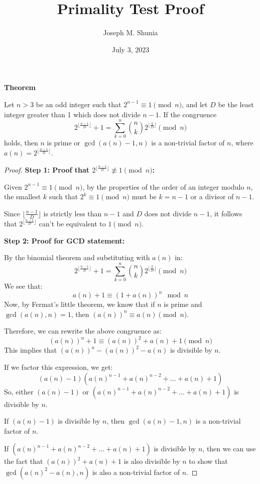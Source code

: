 \documentclass{article}
\title{Primality Test Proof}
\author{Joseph M. Shunia}
\date{July 3, 2023}
\begin{document}
\maketitle

\textbf{Theorem}
\begin{theorem}
Let $n > 3$ be an odd integer such that $2^{n-1} \equiv 1 \pmod{n}$, and let $D$ be the least integer greater than 1 which does not divide $n-1$. If the congruence
\[
2^{\lfloor\frac{n-1}{D}\rfloor} + 1 = \sum_{k=0}^{n}\binom{n}{k}2^{\lfloor\frac{k}{D}\rfloor} \pmod{n}
\]
holds, then $n$ is prime or $\gcd(a(n) - 1, n)$ is a non-trivial factor of $n$, where $a(n) = 2^{\lfloor\frac{n-1}{D}\rfloor}$.
\end{theorem}

\begin{proof}
\textbf{Step 1: Proof that $2^{\lfloor\frac{n-1}{D}\rfloor} \not\equiv 1 \pmod{n}$:}

Given $2^{n-1} \equiv 1 \pmod{n}$, by the properties of the order of an integer modulo $n$, the smallest $k$ such that $2^k \equiv 1 \pmod{n}$ must be $k = n-1$ or a divisor of $n-1$.

Since $\lfloor\frac{n-1}{D}\rfloor$ is strictly less than $n-1$ and $D$ does not divide $n-1$, it follows that $2^{\lfloor\frac{n-1}{D}\rfloor}$ can't be equivalent to $1 \pmod{n}$.

\textbf{Step 2: Proof for GCD statement:}

By the binomial theorem and substituting with $a(n)$ in:
\[
2^{\lfloor\frac{n-1}{D}\rfloor} + 1 = \sum_{k=0}^{n}\binom{n}{k}2^{\lfloor\frac{k}{D}\rfloor} \pmod{n}
\]
We see that:
\[
a(n) + 1 \equiv (1 + a(n))^n \mod n
\]
Now, by Fermat's little theorem, we know that if $n$ is prime and $\gcd(a(n), n) = 1$, then $(a(n))^n \equiv a(n) \pmod{n}$.

Therefore, we can rewrite the above congruence as:
\[
(a(n))^n + 1 \equiv (a(n))^2 + a(n) + 1 \pmod{n}
\]
This implies that $(a(n))^n - (a(n))^2 - a(n)$ is divisible by $n$. 

If we factor this expression, we get:
\[
(a(n) - 1)(a(n)^{n-1} + a(n)^{n-2} + ... + a(n) + 1)
\]
So, either $(a(n) - 1)$ or $(a(n)^{n-1} + a(n)^{n-2} + ... + a(n) + 1)$ is divisible by $n$. 

If $(a(n) - 1)$ is divisible by $n$, then $\gcd(a(n) - 1, n)$ is a non-trivial factor of $n$. 

If $(a(n)^{n-1} + a(n)^{n-2} + ... + a(n) + 1)$ is divisible by $n$, then we can use the fact that $(a(n))^2 + a(n) + 1$ is also divisible by $n$ to show that $\gcd(a(n)^2 - a(n), n)$ is also a non-trivial factor of $n$. 


\end{proof}
\end{document}
